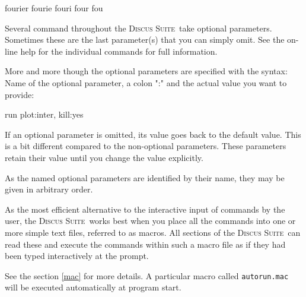 \documentclass[11pt]{report}
\newcommand{\Suite}{\textsc{Discus Suite\ }}
\begin{document}
\begin{MacVerbatim}
  fourier
  fourie
  fouri
  four
  fou
\end{MacVerbatim}


Several command throughout the \Suite take optional parameters.
Sometimes these are the last parameter(s) that you can simply
omit. See the on-line help for the individual commands for
full information.

More and more though the optional parameters are specified with the
syntax: Name of the optional parameter, a colon ":" and the actual
value you want to provide:
\begin{MacVerbatim}
 run  plot:inter, kill:yes
\end{MacVerbatim}
If an optional parameter is omitted, its value goes back to the
default value. This is a bit different compared to the
non-optional parameters. These parameters retain their value
until you change the value explicitly.

As the named optional parameters are identified by their name,
they may be given in arbitrary order.

As the most efficient alternative to the interactive input of
commands by the user, the \Suite works best when you place all the
commands into one or more simple text files, referred to as macros.
All sections of the \Suite can read these and execute the commands within
such a macro file as if they had been typed interactively at the prompt.

See the section {\ref {mac}} for more details. A particular macro called
{\tt autorun.mac} will be executed automatically at program start.
\end{document}
